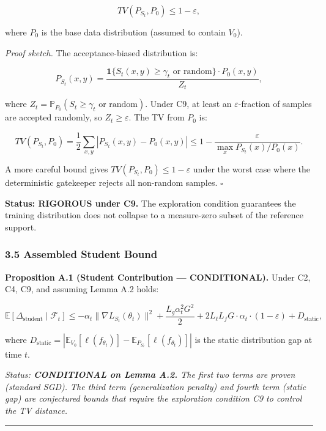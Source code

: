 \documentclass[
  12pt,
]{article}
\begin{document}
\[TV(P_{S_t}, P_0) \leq 1 - \varepsilon,\]

where \(P_0\) is the base data distribution (assumed to contain
\(V_0\)).

\emph{Proof sketch.} The acceptance-biased distribution is:

\[P_{S_t}(x,y) = \frac{\mathbf{1}\{S_t(x,y) \geq \gamma_t \text{ or random}\} \cdot P_0(x,y)}{Z_t},\]

where \(Z_t = \mathbb{P}_{P_0}(S_t \geq \gamma_t \text{ or random})\).
Under C9, at least an \(\varepsilon\)-fraction of samples are accepted
randomly, so \(Z_t \geq \varepsilon\). The TV from \(P_0\) is:

\[TV(P_{S_t}, P_0) = \frac{1}{2} \sum_{x,y} |P_{S_t}(x,y) - P_0(x,y)| \leq 1 - \frac{\varepsilon}{\max_x P_{S_t}(x)/P_0(x)}.\]

A more careful bound gives \(TV(P_{S_t}, P_0) \leq 1 - \varepsilon\)
under the worst case where the deterministic gatekeeper rejects all
non-random samples. \(\square\)

\textbf{Status: RIGOROUS under C9.} The exploration condition guarantees
the training distribution does not collapse to a measure-zero subset of
the reference support.

\subsubsection{3.5 Assembled Student
Bound}\label{assembled-student-bound}

\textbf{Proposition A.1 (Student Contribution --- CONDITIONAL).} Under
C2, C4, C9, and assuming Lemma A.2 holds:

\[\mathbb{E}[\Delta_{\text{student}} \mid \mathcal{F}_t] \leq -\alpha_t \|\nabla L_{S_t}(\theta_t)\|^2 + \frac{L_g \alpha_t^2 G^2}{2} + 2 L_\ell L_f G \cdot \alpha_t \cdot (1 - \varepsilon) + D_{\text{static}},\]

where
\(D_{\text{static}} = |\mathbb{E}_{V_0}[\ell(f_{\theta_t})] - \mathbb{E}_{P_{S_t}}[\ell(f_{\theta_t})]|\)
is the static distribution gap at time \(t\).

\emph{Status: \textbf{CONDITIONAL on Lemma A.2.} The first two terms are
proven (standard SGD). The third term (generalization penalty) and
fourth term (static gap) are conjectured bounds that require the
exploration condition C9 to control the TV distance.}

\begin{center}\rule{0.5\linewidth}{0.5pt}\end{center}
\end{document}
